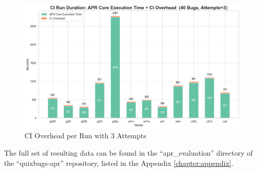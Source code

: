 \begin{figure}[H]
    \centering
    \includegraphics[width=1\textwidth]{images/diagrams/ci_vs_exec_time_per_run_stacked_attempts_3.png}
    \caption{CI Overhead per Run with 3 Attempts}
    \label{fig:ci-vs-exec-time-per-run-attempts-3}
\end{figure}


The full set of resulting data can be found in the ``apr\_evaluation'' directory of the ``quixbugs-apr'' repository, listed in the Appendix \ref{chapter:appendix}.